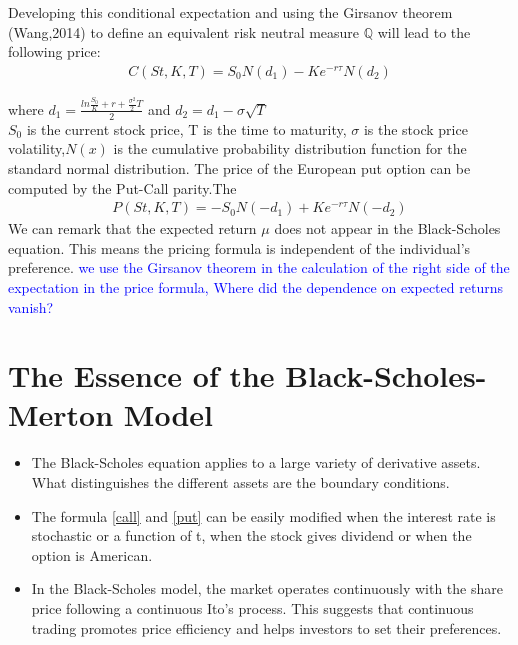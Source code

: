 \documentclass[12pt]{report}
\begin{document}
Developing this conditional expectation and using the Girsanov theorem (Wang,2014) to define an equivalent risk neutral measure $\mathbb{Q}$ will lead to the following price:
\begin{gather}
C(St,K,T)= S_0 N(d_1) - K e^{-r \tau} N(d_2)
\label{call}
\end{gather}

where $ d_1= \frac{ln\frac{S_0}{K}+r+\frac{\sigma^2}{2}T}{2} $ and $d_2 = d_1-\sigma \sqrt{T} $ \\
$ S_0$ is the current stock price, T is the time to maturity, $\sigma$ is the stock price volatility,$N(x)$ is the cumulative probability distribution function for the standard normal distribution. The price of the European put option can
be computed by the Put-Call parity.The 
\begin{gather}
P(St,K,T)= -S_0 N(-d_1) + K e^{-r \tau} N(-d_2)
\label{put}
\end{gather}
We can remark that the expected return $\mu$ does not appear in the Black-Scholes equation. This means the pricing formula is independent of the individual’s preference. 
\textcolor{blue}{we use the Girsanov theorem in the calculation of the right side of the expectation in the price formula, 
Where did the dependence on expected returns vanish? }

\section{The Essence  of the Black-Scholes-Merton Model}
\begin{itemize}

\item The Black-Scholes equation applies to a large variety of derivative assets. What distinguishes the different assets are the boundary conditions.
\item The formula \eqref{call} and \eqref{put} can be easily modified when the interest rate is stochastic or a function of t, when the stock gives dividend or when the option is American.

\item  In the Black-Scholes model, the market operates continuously with the share price following a continuous Ito’s process.  This suggests that continuous trading promotes price efficiency and helps investors to set their preferences.
\end{itemize}
\end{document}
